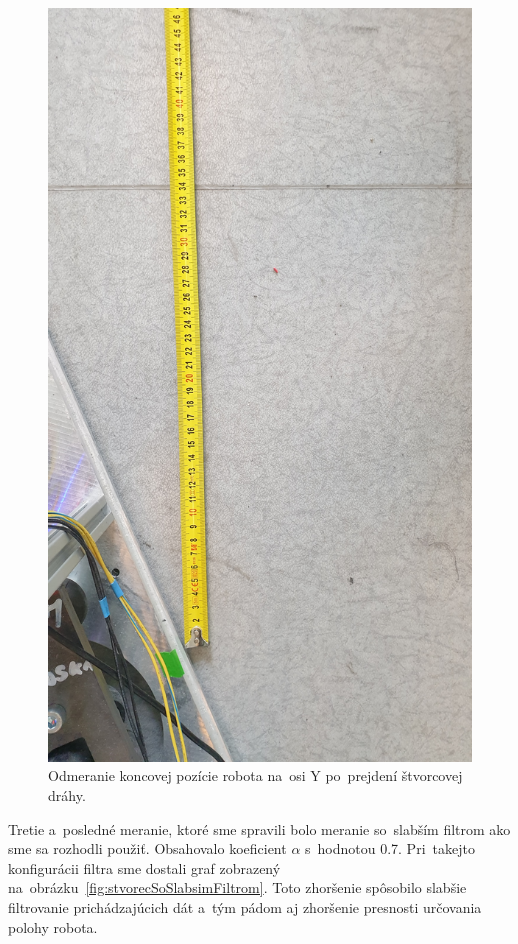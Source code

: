 \begin{figure}[!htbp]
	\begin{center}
		\includegraphics[width=\textwidth]{img/robot_stop_measured_Y.jpg}
	\end{center}
	\caption{Odmeranie koncovej pozície robota na~osi Y po~prejdení štvorcovej dráhy.}
	\label{fig:stvorec_meranie_Y}
\end{figure}

\clearpage

Tretie a~posledné meranie, ktoré sme spravili bolo meranie so~slabším filtrom ako sme sa rozhodli použiť. Obsahovalo
koeficient $\alpha$ s~hodnotou 0.7. Pri~takejto konfigurácii filtra sme dostali graf zobrazený
na~obrázku~\ref{fig:stvorecSoSlabsimFiltrom}. Toto zhoršenie spôsobilo slabšie filtrovanie prichádzajúcich dát a~tým pádom aj
zhoršenie presnosti určovania polohy robota.

